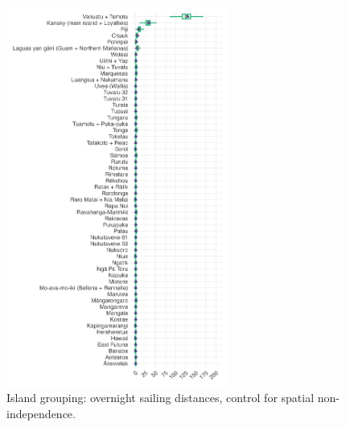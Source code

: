 \documentclass[unnumsec,webpdf,modern,medium]{oup-authoring-template}
\begin{document}
\begin{figure}[ht]
\includegraphics[width=0.65\textwidth]{brms_predict_SBZR_control_spatial.png}
\caption{Island grouping: overnight sailing distances, control for spatial non-independence.}
\label{brms_predict_SBZR_control_spatial}
\end{figure}
\end{document}
